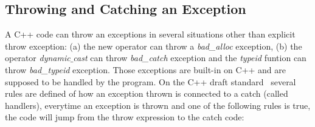\documentclass[a4paper]{llncs}
\begin{document}
\subsection{Throwing and Catching an Exception}

A C++ code can throw an exceptions in several situations other
than explicit throw exception: (a) the new operator can throw a \textit{bad\_alloc}
exception, (b) the operator \textit{dynamic$\_$cast} can throw \textit{bad\_catch}
exception and the \textit{typeid} funtion can throw \textit{bad\_typeid} exception.
Those exceptions are built-in on C++ and are supposed to be handled by the program.
On the C++ draft standard~\cite{CppDraft} several rules are defined of how an exception
thrown is connected to a catch (called handlers), everytime an exception is thrown and
one of the following rules is true, the code will jump from the throw expression to the catch code:
\end{document}
